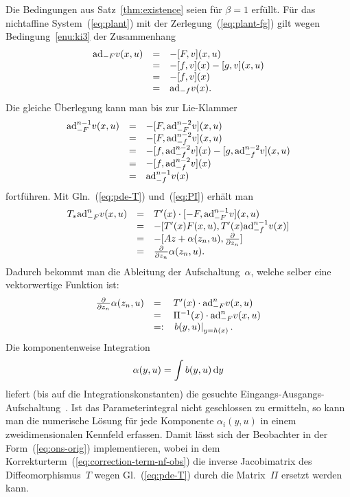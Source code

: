 Die Bedingungen aus Satz~\ref{thm:existence} seien für $\beta=1$
erfüllt. Für das nichtaffine System~(\ref{eq:plant}) mit der Zerlegung~(\ref{eq:plant-fg})
gilt wegen Bedingung~\ref{enu:ki3} der Zusammenhang
\[
\begin{array}{ccl}
{\operatorname{ad}}_{-F}v(x,u) & = & -[F,v](x,u)\\
 & = & -[f,v](x)-[g,v](x,u)\\
 & = & -[f,v](x)\\
 & = & {\operatorname{ad}}_{-f}v(x).
\end{array}
\]
Die gleiche Überlegung kann man bis zur Lie-Klammer
\begin{equation}
\begin{array}{ccl}
{\operatorname{ad}}_{-F}^{n-1}v(x,u) & = & -[F,{\operatorname{ad}}_{-F}^{n-2}v](x,u)\\
 & = & -[F,{\operatorname{ad}}_{-f}^{n-2}v](x,u)\\
 & = & -[f,{\operatorname{ad}}_{-f}^{n-2}v](x)-[g,{\operatorname{ad}}_{-f}^{n-2}v](x,u)\\
 & = & -[f,{\operatorname{ad}}_{-f}^{n-2}v](x)\\
 & = & {\operatorname{ad}}_{-f}^{n-1}v(x)
\end{array}\label{eq:hilfsrechnung-ad-n-1}
\end{equation}
fortführen. Mit Gln.~(\ref{eq:pde-T}) und~(\ref{eq:PI}) erhält
man 
\[
\begin{array}{lcl}
T_{*}{\operatorname{ad}}_{-F}^{n}v(x,u) & = & T^{\prime}(x)\cdot[-F,{\operatorname{ad}}_{-F}^{n-1}v](x,u)\\
 & = & -[T^{\prime}(x)F(x,u),T^{\prime}(x){\operatorname{ad}}_{-f}^{n-1}v(x)]\\
 & = & -[Az+\alpha(z_{n},u),\frac{\partial}{\partial z_{n}}]\\
 & = & \frac{\partial}{\partial z_{n}}\alpha(z_{n},u).
\end{array}
\]
Dadurch bekommt man die Ableitung der Aufschaltung~$\alpha$, welche
selber eine vektorwertige Funktion ist:
\begin{equation}
\begin{array}{rll}
\frac{\partial}{\partial z_{n}}\alpha(z_{n},u) & = & T^{\prime}(x)\cdot{\operatorname{ad}}_{-F}^{n}v(x,u)\\
 & = & \Pi^{-1}(x)\cdot{\operatorname{ad}}_{-F}^{n}v(x,u)\\
 & =: & \left.b(y,u)\right|_{y=h(x)}.
\end{array}\label{eq:tao-dalpha}
\end{equation}
Die komponentenweise Integration
\begin{equation}
\alpha(y,u)=\int b(y,u)\,{\mathrm{d}} y\label{eq:tao-alpha}
\end{equation}
liefert (bis auf die Integrationskonstanten) die gesuchte Eingangs-Ausgangs-Aufschaltung~\cite{li1986}.
Ist das Parameterintegral nicht geschlossen zu ermitteln, so kann
man die numerische Lösung für jede Komponente $\alpha_{i}(y,u)$ in
einem zweidimensionalen Kennfeld erfassen. Damit lässt sich der Beobachter
in der Form~(\ref{eq:ons-orig}) implementieren, wobei in dem Korrekturterm~(\ref{eq:correction-term-nf-obs})
die inverse Jacobimatrix des Diffeomorphismus~$T$ wegen Gl.~(\ref{eq:pde-T})
durch die Matrix~$\Pi$ ersetzt werden kann.


